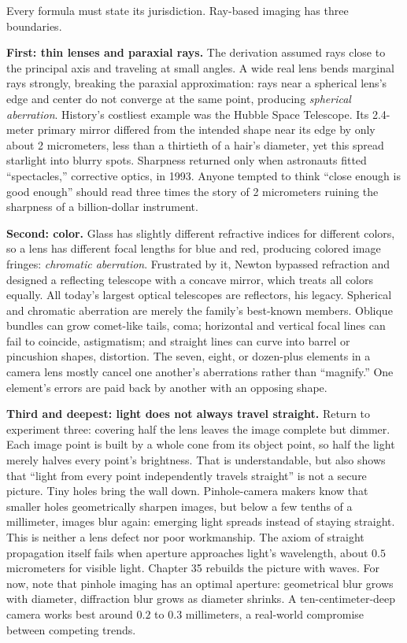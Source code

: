 \begin{mainline}


Every formula must state its jurisdiction. Ray-based imaging has three boundaries.

\textbf{First: thin lenses and paraxial rays.} The derivation assumed rays close to the principal axis and traveling at small angles. A wide real lens bends marginal rays strongly, breaking the paraxial approximation: rays near a spherical lens's edge and center do not converge at the same point, producing \emph{spherical aberration}. History's costliest example was the Hubble Space Telescope. Its 2.4-meter primary mirror differed from the intended shape near its edge by only about 2 micrometers, less than a thirtieth of a hair's diameter, yet this spread starlight into blurry spots. Sharpness returned only when astronauts fitted ``spectacles,'' corrective optics, in 1993. Anyone tempted to think ``close enough is good enough'' should read three times the story of 2 micrometers ruining the sharpness of a billion-dollar instrument.

\textbf{Second: color.} Glass has slightly different refractive indices for different colors, so a lens has different focal lengths for blue and red, producing colored image fringes: \emph{chromatic aberration}. Frustrated by it, Newton bypassed refraction and designed a reflecting telescope with a concave mirror, which treats all colors equally. All today's largest optical telescopes are reflectors, his legacy. Spherical and chromatic aberration are merely the family's best-known members. Oblique bundles can grow comet-like tails, coma; horizontal and vertical focal lines can fail to coincide, astigmatism; and straight lines can curve into barrel or pincushion shapes, distortion. The seven, eight, or dozen-plus elements in a camera lens mostly cancel one another's aberrations rather than ``magnify.'' One element's errors are paid back by another with an opposing shape.

\textbf{Third and deepest: light does not always travel straight.} Return to experiment three: covering half the lens leaves the image complete but dimmer. Each image point is built by a whole cone from its object point, so half the light merely halves every point's brightness. That is understandable, but also shows that ``light from every point independently travels straight'' is not a secure picture. Tiny holes bring the wall down. Pinhole-camera makers know that smaller holes geometrically sharpen images, but below a few tenths of a millimeter, images blur again: emerging light spreads instead of staying straight. This is neither a lens defect nor poor workmanship. The axiom of straight propagation itself fails when aperture approaches light's wavelength, about $0.5$ micrometers for visible light. Chapter 35 rebuilds the picture with waves. For now, note that pinhole imaging has an optimal aperture: geometrical blur grows with diameter, diffraction blur grows as diameter shrinks. A ten-centimeter-deep camera works best around $0.2$ to $0.3$ millimeters, a real-world compromise between competing trends.


\end{mainline}
